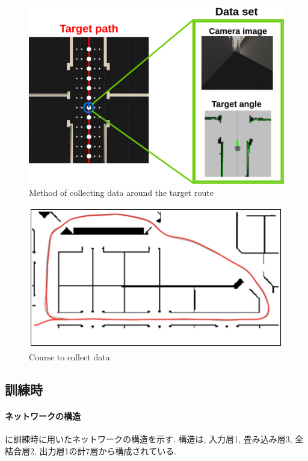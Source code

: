 \newpage
  \begin{figure}[h]
  \centering
  \includegraphics[keepaspectratio, scale=0.25]{images/collect-data2.png}
  \caption{Method of collecting data around the target route}
  \label{Fig:collect-data2}
  \end{figure}

\vspace{15mm}

\begin{figure}[h]
  \centering
  \includegraphics[keepaspectratio, scale=0.5]{images/willow-garage.png}
  \caption{Course to collect data}
  \label{Fig:willow-garage}
  \end{figure}

\newpage
\subsection{訓練時}
\paragraph{ネットワークの構造}
に訓練時に用いたネットワークの構造を示す. 構造は, 入力層1, 畳み込み層3, 全結合層2, 出力層1の計7層から構成されている. 

